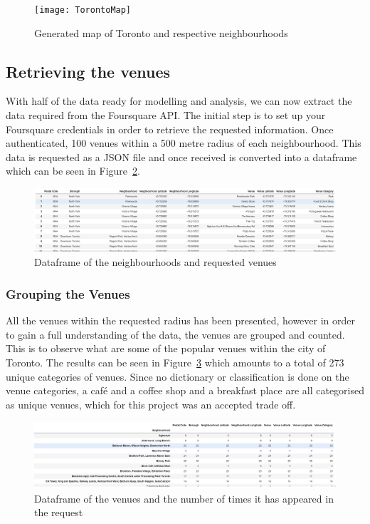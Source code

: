 \documentclass[12pt, conference]{IEEEtran}
\begin{document}
\begin{figure}[!h]
\center
\texttt{[image: TorontoMap]}
\caption{Generated map of Toronto and respective neighbourhoods}
\label{fig: Toronto}
\end{figure}

\subsection{Retrieving the venues}
With half of the data ready for modelling and analysis, we can now extract the data required from the Foursquare API. The initial step is to set up your Foursquare credentials in order to retrieve the requested information. Once authenticated, 100 venues within a 500 metre radius of each neighbourhood. This data is requested as a JSON file and once received is converted into a dataframe which can be seen in Figure~\ref{fig: Venues}.

\begin{figure}[!h]
\center
\includegraphics[scale=0.5]{Venuesdf}
\caption{Dataframe of the neighbourhoods and requested venues}
\label{fig: Venues}
\end{figure}

\subsubsection{Grouping the Venues}
All the venues within the requested radius has been presented, however in order to gain a full understanding of the data, the venues are grouped and counted. This is to observe what are some of the popular venues within the city of Toronto. The results can be seen in Figure~\ref{fig: GroupedVenues} which amounts to a total of 273 unique categories of venues. Since no dictionary or classification is done on the venue categories, a café and a coffee shop and a breakfast place are all categorised as unique venues, which for this project was an accepted trade off.

\begin{figure}[!h]
\center
\includegraphics[scale=0.5]{GroupedVenues}
\caption{Dataframe of the venues and the number of times it has appeared in the request}
\label{fig: GroupedVenues}
\end{figure}
\end{document}
